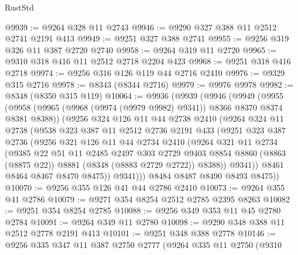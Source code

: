 \begin{lexlean}{RustStd}
\begin{coremodule}
{\begin{coremodule}
{{{{{{{{{{{{{{{{{{{{{{{{{{{{{{{{{{{{{{{{{{{{{{{{{{@9939 := @9264 @328 @11 @2743
@9946 := @9290 @327 @388 @11 @2512 @2741 @2191 @413
@9949 := @9251 @327 @388 @2741
@9955 := @9256 @319 @326 @11 @387 @2720 @2740
@9958 := @9264 @319 @11 @2720
@9965 := @9310 @318 @416 @11 @2512 @2718 @2204 @423
@9968 := @9251 @318 @416 @2718
@9974 := @9256 @316 @126 @119 @44 @2716 @2410
@9976 := @9329 @315 @2716
@9978 := @8343 (@8344 @2716)
@9979 := @9976 @9978
@9982 := @8348 (@8350 @315 @119)
@10064 := @9936
    (@9939
      (@9946
        (@9949
          (@9955
            (@9958 (@9965 (@9968 (@9974 (@9979 @9982) @9341)) @8366 @8370 @8374 @8381 @8388))
            (@9256
              @324
              @126
              @11
              @44
              @2738
              @2410
              (@9264
                @324
                @11
                @2738
                (@9538
                  @323
                  @387
                  @11
                  @2512
                  @2736
                  @2191
                  @433
                  (@9251
                    @323
                    @387
                    @2736
                    (@9256
                      @321
                      @126
                      @11
                      @44
                      @2734
                      @2410
                      (@9264
                        @321
                        @11
                        @2734
                        (@9385
                          @22
                          @51
                          @11
                          @2485
                          @2497
                          @303
                          @2729
                          @9403
                          @8854
                          @8860
                          (@8863 (@8875 @22))
                          @8881
                          (@8348 (@8883 @2729 @2722))
                          @8388))
                      @9341))
                  @8461
                  @8464
                  @8467
                  @8470
                  @8475))
              @9341)))
        @8484
        @8487
        @8490
        @8493
        @8475))
@10070 := @9256 @355 @126 @41 @44 @2786 @2410
@10073 := @9264 @355 @41 @2786
@10079 := @9271 @354 @8254 @2512 @2785 @2395 @8263
@10082 := @9251 @354 @8254 @2785
@10088 := @9256 @349 @353 @11 @45 @2780 @2784
@10091 := @9264 @349 @11 @2780
@10098 := @9290 @348 @388 @11 @2512 @2778 @2191 @413
@10101 := @9251 @348 @388 @2778
@10146 := @9256
    @335
    @347
    @11
    @387
    @2750
    @2777
    (@9264
      @335
      @11
      @2750
      (@9310
}}}}}}}}}}}}}}}}}}}}}}}}}}}}}}}}}}}}}}}}}}}}}}}}}}
\end{coremodule}}
\end{coremodule}
\end{lexlean}
